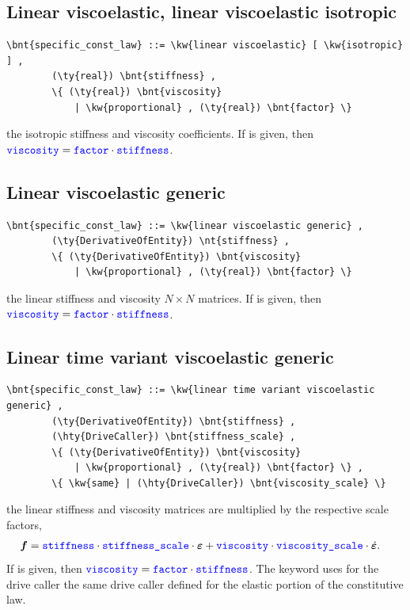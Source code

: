 \subsection{Linear viscoelastic, linear viscoelastic isotropic}
\begin{Verbatim}[commandchars=\\\{\}]
    \bnt{specific_const_law} ::= \kw{linear viscoelastic} [ \kw{isotropic} ] ,
        (\ty{real}) \bnt{stiffness} ,
        \{ (\ty{real}) \bnt{viscosity}
            | \kw{proportional} , (\ty{real}) \bnt{factor} \}
\end{Verbatim}
the isotropic stiffness and viscosity coefficients.
If  is given, then
$\textcolor{blue}{\texttt{viscosity}} = \textcolor{blue}{\texttt{factor}} \cdot \textcolor{blue}{\texttt{stiffness}}$.
  
\subsection{Linear viscoelastic generic}
\begin{Verbatim}[commandchars=\\\{\}]
    \bnt{specific_const_law} ::= \kw{linear viscoelastic generic} ,  
        (\ty{DerivativeOfEntity}) \nt{stiffness} ,
        \{ (\ty{DerivativeOfEntity}) \bnt{viscosity} 
            | \kw{proportional} , (\ty{real}) \bnt{factor} \}
\end{Verbatim}
the linear stiffness and viscosity $N \times N$ matrices.
If  is given, then
$\textcolor{blue}{\texttt{viscosity}} = \textcolor{blue}{\texttt{factor}} \cdot \textcolor{blue}{\texttt{stiffness}}$.
  
\subsection{Linear time variant viscoelastic generic}
\begin{Verbatim}[commandchars=\\\{\}]
    \bnt{specific_const_law} ::= \kw{linear time variant viscoelastic generic} ,
        (\ty{DerivativeOfEntity}) \bnt{stiffness} ,
        (\hty{DriveCaller}) \bnt{stiffness_scale} ,
        \{ (\ty{DerivativeOfEntity}) \bnt{viscosity}
            | \kw{proportional} , (\ty{real}) \bnt{factor} \} ,
        \{ \kw{same} | (\hty{DriveCaller}) \bnt{viscosity_scale} \}
\end{Verbatim}
the linear stiffness and viscosity matrices are multiplied
by the respective scale factors,
\begin{align}
	\boldsymbol{f} &= \textcolor{blue}{\texttt{stiffness}} \cdot \textcolor{blue}{\texttt{stiffness\_scale}} \cdot \boldsymbol{\varepsilon}
		+ \textcolor{blue}{\texttt{viscosity}} \cdot \textcolor{blue}{\texttt{viscosity\_scale}} \cdot \dot{\boldsymbol{\varepsilon}}
	.
\end{align}
If  is given, then
$\textcolor{blue}{\texttt{viscosity}} = \textcolor{blue}{\texttt{factor}} \cdot \textcolor{blue}{\texttt{stiffness}}$.
The keyword  uses for the drive caller  the same drive caller  defined for the elastic portion of the constitutive law.


